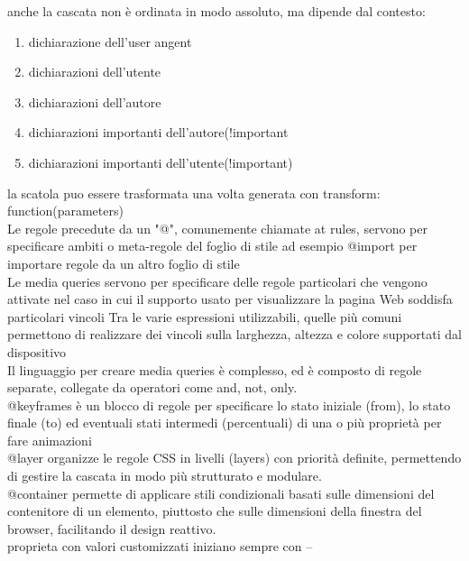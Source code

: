 \documentclass[12pt]{article}
\begin{document}
    anche la cascata non è ordinata in modo assoluto, ma dipende dal contesto:
    \begin{enumerate}
    \item dichiarazione dell'user angent
    \item dichiarazioni dell'utente 
    \item dichiarazioni dell'autore
    \item dichiarazioni importanti dell'autore(!important
    \item dichiarazioni importanti dell'utente(!important)
    \end{enumerate}

    la scatola puo essere trasformata una volta generata con transform: function(parameters)\\

    Le regole precedute da un "@", comunemente chiamate at rules,
servono per specificare ambiti o meta-regole del foglio di stile
ad esempio @import per importare regole da un altro foglio di stile\\

Le media queries servono per specificare delle regole particolari
che vengono attivate nel caso in cui il supporto usato per
visualizzare la pagina Web soddisfa particolari vincoli
Tra le varie espressioni utilizzabili, quelle più comuni permettono
di realizzare dei vincoli sulla larghezza, altezza e colore supportati
dal dispositivo\\

Il linguaggio per creare media queries è complesso,
ed è composto di regole separate, collegate da
operatori come and, not, only.\\

@keyframes è un blocco di regole per specificare lo
stato iniziale (from), lo stato finale (to) ed eventuali stati
intermedi (percentuali) di una o più proprietà per fare animazioni\\

@layer organizze le regole CSS in livelli (layers) con priorità definite, permettendo di gestire la cascata in modo più strutturato e modulare.\\

@container permette di applicare stili condizionali basati sulle dimensioni del contenitore di un elemento, piuttosto che sulle dimensioni della finestra del browser, facilitando il design reattivo.\\

proprieta con valori customizzati iniziano sempre con --\\
\end{document}
